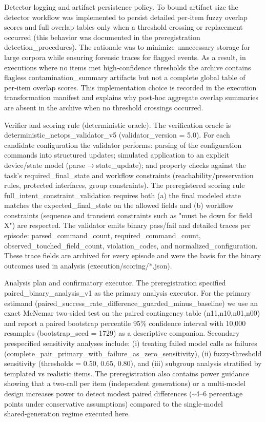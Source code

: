 \documentclass[conference]{IEEEtran}
\begin{document}
Detector logging and artifact persistence policy. To bound artifact size the detector workflow was implemented to persist detailed per‑item fuzzy overlap scores and full overlap tables only when a threshold crossing or replacement occurred (this behavior was documented in the preregistration detection\_procedures). The rationale was to minimize unnecessary storage for large corpora while ensuring forensic traces for flagged events. As a result, in executions where no items met high‑confidence thresholds the archive contains flagless contamination\_summary artifacts but not a complete global table of per‑item overlap scores. This implementation choice is recorded in the execution transformation manifest and explains why post‑hoc aggregate overlap summaries are absent in the archive when no threshold crossings occurred.

Verifier and scoring rule (deterministic oracle). The verification oracle is deterministic\_netops\_validator\_v5 (validator\_version = 5.0). For each candidate configuration the validator performs: parsing of the configuration commands into structured updates; simulated application to an explicit device/state model (parse\ensuremath{\rightarrow}state\_update); and property checks against the task's required\_final\_state and workflow constraints (reachability/preservation rules, protected interfaces, group constraints). The preregistered scoring rule full\_intent\_constraint\_validation requires both (a) the final modeled state matches the expected\_final\_state on the allowed fields and (b) workflow constraints (sequence and transient constraints such as "must be down for field X") are respected. The validator emits binary pass/fail and detailed traces per episode: parsed\_command\_count, required\_command\_count, observed\_touched\_field\_count, violation\_codes, and normalized\_configuration. These trace fields are archived for every episode and were the basis for the binary outcomes used in analysis (execution/scoring/*.json).

Analysis plan and confirmatory executor. The preregistration specified paired\_binary\_analysis\_v1 as the primary analysis executor. For the primary estimand (paired\_success\_rate\_difference\_guarded\_minus\_baseline) we use an exact McNemar two‑sided test on the paired contingency table (n11,n10,n01,n00) and report a paired bootstrap percentile 95\% confidence interval with 10,000 resamples (bootstrap\_seed = 1729) as a descriptive companion. Secondary prespecified sensitivity analyses include: (i) treating failed model calls as failures (complete\_pair\_primary\_with\_failure\_as\_zero\_sensitivity), (ii) fuzzy‑threshold sensitivity (thresholds = 0.50, 0.65, 0.80), and (iii) subgroup analysis stratified by templated vs realistic items. The preregistration also contains power guidance showing that a two‑call per item (independent generations) or a multi‑model design increases power to detect modest paired differences (\textasciitilde{}4--6 percentage points under conservative assumptions) compared to the single‑model shared‑generation regime executed here.
\end{document}
